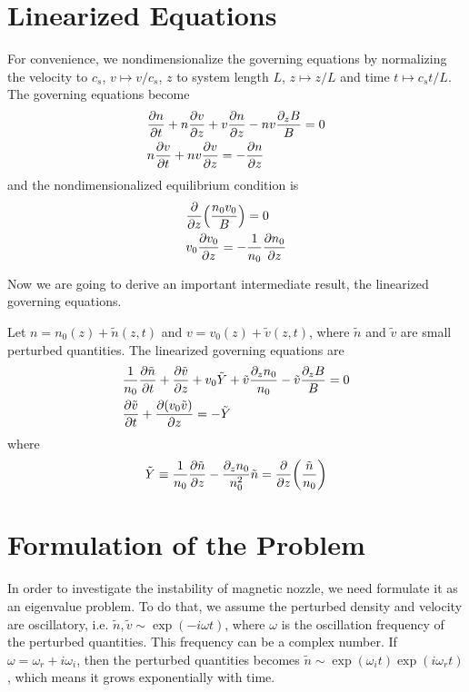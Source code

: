 \section{Linearized Equations}
For convenience, we nondimensionalize the governing equations by normalizing the velocity to $c_s$, $v\mapsto v/c_s$, $z$ to system length $L$, $z \mapsto z/L$ and time $t\mapsto c_s t/L$. The governing equations become
\begin{align}
    &\pdv{n}{t} + n\pdv{v}{z} + v\pdv{n}{z} - nv\frac{\partial_z B}{B} = 0 \\
    &n\pdv{v}{t} + nv\pdv{v}{z} = -\pdv{n}{z}
\end{align}
and the nondimensionalized equilibrium condition is
\begin{align}
    &\pdv{z}(\frac{n_0v_0}{B}) = 0 \label{eq:equilibrium-convervation-of-mass}\\
    &v_0\pdv{v_0}{z} = -\frac{1}{n_0}\pdv{n_0}{z} \label{eq:equilibrium-convervation-of-momentum}
\end{align}

Now we are going to derive an important intermediate result, the linearized governing equations.
\begin{proposition}
    Let $n = n_0(z) + \tilde{n}(z,t)$ and $v = v_0(z) + \tilde{v}(z,t)$, where $\tilde{n}$ and $\tilde{v}$ are small perturbed quantities. The linearized governing equations are
    \begin{align}
        &\frac{1}{n_0}\pdv{\tilde{n}}{t} 
        + \pdv{\tilde{v}}{z} + v_0\tilde{Y} + \tilde{v}\frac{\partial_z n_0}{n_0} - \tilde{v}\frac{\partial_z B}{B} = 0 
        \label{eq:linearized-conservation-of-mass}
        \\
        &\pdv{\tilde{v}}{t} + \pdv{(v_0\tilde{v})}{z} = -\tilde{Y}
        \label{eq:linearized-conservation-of-momentum}
    \end{align}
    where 
    \[ \tilde{Y} \equiv \frac{1}{n_0}\pdv{\tilde{n}}{z} - \frac{\partial_z n_0}{n_0^2}\tilde{n} = \pdv{z}(\frac{\tilde{n}}{n_0}) \]
\end{proposition}

\section{Formulation of the Problem}
In order to investigate the instability of magnetic nozzle, we need formulate it as an eigenvalue problem. To do that, we assume the perturbed density and velocity are oscillatory, i.e. $\tilde{n}, \tilde{v} \sim \exp(-i\omega t)$, where $\omega$ is the oscillation frequency of the perturbed quantities. This frequency can be a complex number. If $\omega = \omega_r +i \omega_i$, then the perturbed quantities becomes $\tilde{n} \sim \exp(\omega_i t)\exp(i\omega_r t)$, which means it grows exponentially with time.

